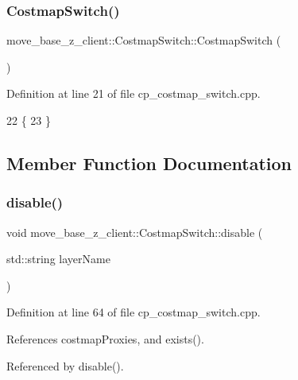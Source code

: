 \subsubsection{\texorpdfstring{Costmap\+Switch()}{CostmapSwitch()}}
{\footnotesize\ttfamily move\+\_\+base\+\_\+z\+\_\+client\+::\+Costmap\+Switch\+::\+Costmap\+Switch (\begin{DoxyParamCaption}{ }\end{DoxyParamCaption})}



Definition at line 21 of file cp\+\_\+costmap\+\_\+switch.\+cpp.


\begin{DoxyCode}
22 \{
23 \}
\end{DoxyCode}


\subsection{Member Function Documentation}
\mbox{\label{classmove__base__z__client_1_1CostmapSwitch_a14a70c2952a2bf34b2f8a383fdd5841f}} 
\subsubsection{\texorpdfstring{disable()}{disable()}\hspace{0.1cm}{\footnotesize\ttfamily [1/2]}}
{\footnotesize\ttfamily void move\+\_\+base\+\_\+z\+\_\+client\+::\+Costmap\+Switch\+::disable (\begin{DoxyParamCaption}\item[{std\+::string}]{layer\+Name }\end{DoxyParamCaption})}



Definition at line 64 of file cp\+\_\+costmap\+\_\+switch.\+cpp.



References costmap\+Proxies, and exists().



Referenced by disable().



